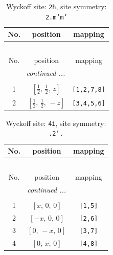 \documentclass[fleqn,8pt]{jsarticle}
\begin{document}
\begin{longtable}{ccc}
\caption{Wyckoff site: {\tt 2h}, site symmetry: {\tt 2.m'm'}}
 \\
 \hline \hline
No. & position & mapping \\ \hline \endfirsthead

\multicolumn{2}{l}{\tablename\ \thetable{}} \\
 \hline \hline
No. & position & mapping \\ \hline \endhead

 \hline \hline
\multicolumn{2}{r}{\footnotesize\it continued ...} \\ \endfoot

 \hline \hline
\multicolumn{2}{r}{} \\ \endlastfoot

1 & $\left[ \frac{1}{2},\, \frac{1}{2},\, z \right]$ & {\tt [1,2,7,8]} \\ \hline
2 & $\left[ \frac{1}{2},\, \frac{1}{2},\, - z \right]$ & {\tt [3,4,5,6]} \\
\end{longtable}
\renewcommand{\arraystretch}{1.2}
\begin{longtable}{ccc}
\caption{Wyckoff site: {\tt 4i}, site symmetry: {\tt .2'.}}
 \\
 \hline \hline
No. & position & mapping \\ \hline \endfirsthead

\multicolumn{2}{l}{\tablename\ \thetable{}} \\
 \hline \hline
No. & position & mapping \\ \hline \endhead

 \hline \hline
\multicolumn{2}{r}{\footnotesize\it continued ...} \\ \endfoot

 \hline \hline
\multicolumn{2}{r}{} \\ \endlastfoot

1 & $\left[ x,\, 0,\, 0 \right]$ & {\tt [1,5]} \\ \hline
2 & $\left[ - x,\, 0,\, 0 \right]$ & {\tt [2,6]} \\ \hline
3 & $\left[ 0,\, - x,\, 0 \right]$ & {\tt [3,7]} \\ \hline
4 & $\left[ 0,\, x,\, 0 \right]$ & {\tt [4,8]} \\
\end{longtable}
\renewcommand{\arraystretch}{1.2}
\end{document}

